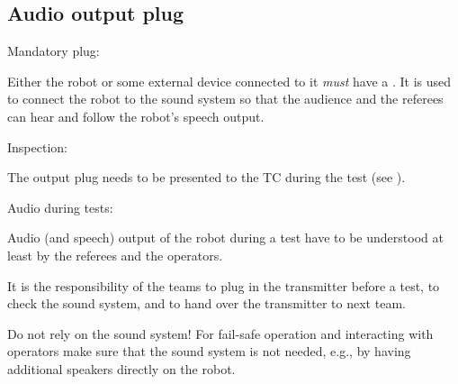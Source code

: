 \subsection{Audio output plug}\label{rule:roobt_audio_out}

\begin{enumerate}
	{\bf\item Mandatory plug:} Either the robot or some external device connected to it \emph{must} have a . It is used to connect the robot to the sound system so that the audience and the referees can hear and follow the robot's speech output.
	{\bf\item Inspection:} The output plug needs to be presented to the TC during the  test (see ).
	{\bf\item Audio during tests:} Audio (and speech) output of the robot during a test have to be understood at least by the referees and the operators.
	\begin{compactitem}
		\item It is the responsibility of the teams to plug in the transmitter before a test, to check the sound system, and to hand over the transmitter to next team.
		\item Do not rely on the sound system! For fail-safe operation and interacting with operators make sure that the sound system is not needed, e.g., by having additional speakers directly on the robot.
\end{compactitem}
\end{enumerate}


